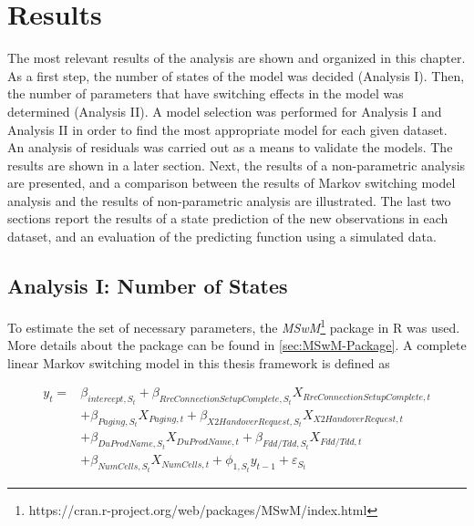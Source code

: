 
\lhead[\chaptername~\thechapter]{\rightmark}

\rhead[\leftmark]{}

\lfoot[\thepage]{}

\cfoot{}

\rfoot[]{\thepage}

\chapter{Results}

The most relevant results of the analysis are shown and organized
in this chapter. As a first step, the number of states of the model
was decided (Analysis I). Then, the number of parameters that have
switching effects in the model was determined (Analysis II). A model
selection was performed for Analysis I and Analysis II in order to
find the most appropriate model for each given dataset. An analysis
of residuals was carried out as a means to validate the models. The
results are shown in a later section. Next, the results of a non-parametric
analysis are presented, and a comparison between the results of Markov
switching model analysis and the results of non-parametric analysis
are illustrated. The last two sections report the results of a state
prediction of the new observations in each dataset, and an evaluation
of the predicting function using a simulated data. 

\section{Analysis I: Number of States \label{sec:States}}

To estimate the set of necessary parameters, the \emph{MSwM}\footnote{https://cran.r-project.org/web/packages/MSwM/index.html}
package in R was used. More details about the package can be found
in \ref{sec:MSwM-Package}. A complete linear Markov switching model
in this thesis framework is defined as

\begin{align}
y_{t}= & \beta_{intercept,S_{t}}+\beta_{RrcConnectionSetupComplete,S_{t}}X_{RrcConnectionSetupComplete,t}\nonumber \\
 & +\beta_{Paging,S_{t}}X_{Paging,t}+\beta_{X2HandoverRequest,S_{t}}X_{X2HandoverRequest,t}\label{eq:mswm}\\
 & +\beta_{DuProdName,S_{t}}X_{DuProdName,t}+\beta_{Fdd/Tdd,S_{t}}X_{Fdd/Tdd,t}\nonumber \\
 & +\beta_{NumCells,S_{t}}X_{NumCells,t}+\phi_{1,S_{t}}y_{t-1}+\varepsilon_{S_{t}}\nonumber 
\end{align}

